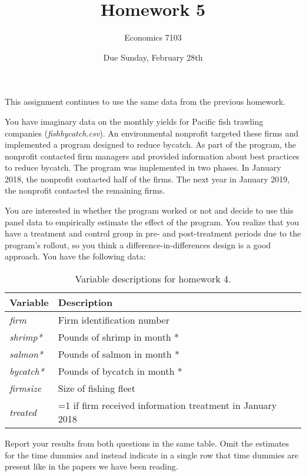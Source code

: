 \documentclass{article}
\title{Homework 5}
\author{Economics 7103}
\date{Due Sunday, February 28th}
\begin{document}
  
\maketitle

\noindent This assignment continues to use the same data from the previous homework.

You have imaginary data on the monthly yields for Pacific fish trawling companies (\textit{fishbycatch.csv}).  An environmental nonprofit targeted these firms and implemented a program designed to reduce bycatch.  As part of the program, the nonprofit contacted firm managers and provided information about best practices to reduce bycatch.  The program was implemented in two phases.  In January 2018, the nonprofit contacted half of the firms.  The next year in January 2019, the nonprofit contacted the remaining firms.

You are interested in whether the program worked or not and decide to use this panel data to empirically estimate the effect of the program.  You realize that you have a treatment and control group in pre- and post-treatment periods due to the program's rollout, so you think a difference-in-differences design is a good approach.  You have the following data:

\begin{table}[h]
    \centering
    \begin{tabular}{l|l}
        Variable & Description \\ \hline
         \textit{firm} & Firm identification number  \\
         \textit{shrimp*} & Pounds of shrimp in month * \\
         \textit{salmon*} & Pounds of salmon in month * \\
         \textit{bycatch*} & Pounds of bycatch in month * \\
         \textit{firmsize} & Size of fishing fleet \\
         \textit{treated} & =1 if firm received information treatment in January 2018 \\
    \end{tabular}
    \caption{Variable descriptions for homework 4.}
    \label{tab:variables4}
\end{table}

Report your results from both questions in the same table.  Omit the estimates for the time dummies and instead indicate in a single row that time dummies are present like in the papers we have been reading.
\end{document}
